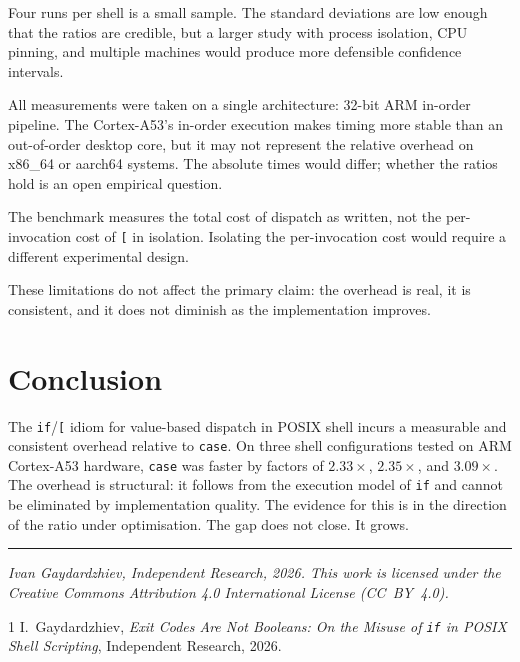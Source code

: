 \documentclass[11pt,a4paper]{article}
\begin{document}
Four runs per shell is a small sample.
The standard deviations are low enough that the ratios are credible,
but a larger study with process isolation, CPU pinning, and multiple
machines would produce more defensible confidence intervals.

All measurements were taken on a single architecture: 32-bit ARM
in-order pipeline.
The Cortex-A53's in-order execution makes timing more stable than
an out-of-order desktop core, but it may not represent the relative
overhead on x86\_64 or aarch64 systems.
The absolute times would differ; whether the ratios hold is an open
empirical question.

The benchmark measures the total cost of dispatch as written, not
the per-invocation cost of \texttt{[} in isolation.
Isolating the per-invocation cost would require a different
experimental design.

These limitations do not affect the primary claim: the overhead is
real, it is consistent, and it does not diminish as the
implementation improves.

\section{Conclusion}

The \texttt{if}/\texttt{[} idiom for value-based dispatch in POSIX
shell incurs a measurable and consistent overhead relative to
\texttt{case}.
On three shell configurations tested on ARM Cortex-A53 hardware,
\texttt{case} was faster by factors of $2.33\times$, $2.35\times$,
and $3.09\times$.
The overhead is structural: it follows from the execution model of
\texttt{if} and cannot be eliminated by implementation quality.
The evidence for this is in the direction of the ratio under
optimisation.
The gap does not close.
It grows.

\vspace{10pt}
\noindent\rule{\linewidth}{0.4pt}
\vspace{4pt}

{\small
\noindent
\textit{Ivan Gaydardzhiev, Independent Research, 2026.
This work is licensed under the Creative Commons Attribution 4.0
International License (CC~BY~4.0).}
}

\begin{thebibliography}{1}
I.~Gaydardzhiev,
\textit{Exit Codes Are Not Booleans: On the Misuse of \texttt{if}
in POSIX Shell Scripting},
Independent Research, 2026.
\end{thebibliography}
\end{document}
